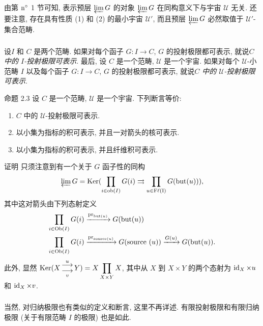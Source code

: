 由第 ${\rm n^\circ}$ 1 节可知,
表示预层 $\varprojlim G$ 的对象 $\varprojlim G$
在同构意义下与宇宙 $𝒰$ 无关.
还要注意, 存在具有性质 (1) 和 (2) 的最小宇宙 $𝒰'$,
而且预层 $\varprojlim G$ 必然取值于 $𝒰'$-集合范畴.

\setcounter{subsection}{2} \setcounter{subsubsection}{0}
\subsubsection{}
设\pageoriginale $I$ 和 $C$ 是两个范畴.
如果对每个函子 $G:I\rightarrow C$, $G$ 的投射极限都可表示,
就说\emph{$C$ 中的 $I$-投射极限可表示}.
最后, 设 $C$ 是一个范畴, $𝒰$ 是一个宇宙.
如果对每个 $𝒰$-小范畴 $I$ 以及每个函子 $G:I\rightarrow
C$, $G$ 的投射极限都可表示,
就说\emph{$C$ 中的 $𝒰$-投射极限可表示}.

\begin{enonce*}{命题 2.3}
设 $C$ 是一个范畴, $𝒰$ 是一个宇宙.
下列断言等价:
\begin{enumerate}
\renewcommand{\theenumi}{\roman{enumi}}
\renewcommand{\labelenumi}{\theenumi)}
\item $C$ 中的 $𝒰$-投射极限可表示.

\item 以小集为指标的积可表示, 并且一对箭头的核可表示.
\item 以小集为指标的积可表示, 并且纤维积可表示.
\end{enumerate}
\end{enonce*}

\begin{enonce*}[remark]{证明}
只须注意到有一个关于 $G$ 函子性的同构
$$
\varprojlim G=\Ker (\prod_{i\in \ob(I)} %
G(i)\rightrightarrows \prod_{u\in \rm{F\ell}(I)} G(\but(u))){\quoi},
$$
其中这对箭头由下列态射定义
\begin{align*}
\prod_{i\in \Ob(I)}  G(i) %
 & \xrightarrow{\pr_{\but(u)}}{} G(\but(u))\\
\prod_{i\in \Ob(I)} G(i) %
 &\xrightarrow{\pr_{\text{source}(u)}}{} G(\text{source
}(u))\xrightarrow{G(u)} G(\but(u)){\quoi}.
\end{align*}
此外, 显然 $\Ker (X  \displaystyle \Lright^{u}_{v}Y)=
X\prod_{X\times Y} X$, 其中从 $X$ 到 $X\times Y$ 的两个态射为
$\operatorname{id}_X \times u$ 和 $\operatorname{id}_X\times v$.
\end{enonce*}

\setcounter{subsection}{3} \setcounter{subsubsection}{0}
\subsubsection{}
当然, 对归纳极限也有类似的定义和断言, 这里不再详述.
有限投射极限\pageoriginale{}和有限归纳极限
(\ie 关于有限范畴 $I$ 的极限) 也是如此.


